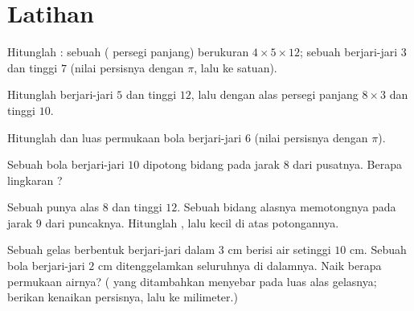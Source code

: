 \section{Latihan}

\begin{exercise}[$\star$]\label{exo:g9:solids:1}
Hitunglah : sebuah  ( persegi panjang) berukuran
$4 \times 5 \times 12$; sebuah  berjari-jari $3$ dan tinggi $7$
(nilai persisnya dengan $\pi$, lalu  ke satuan).
\end{exercise}

\begin{exercise}[$\star$]\label{exo:g9:solids:2}
Hitunglah   berjari-jari $5$ dan tinggi $12$, lalu 
 dengan alas persegi panjang $8 \times 3$ dan tinggi $10$.
\end{exercise}

\begin{exercise}[$\star$]\label{exo:g9:solids:3}
Hitunglah  dan luas permukaan bola berjari-jari $6$ (nilai
persisnya dengan $\pi$).
\end{exercise}

\begin{exercise}[$\star$]\label{exo:g9:solids:4}
Sebuah bola berjari-jari $10$ dipotong bidang pada jarak $8$ dari
pusatnya. Berapa  lingkaran ?
\end{exercise}

\begin{exercise}[$\star\star$]\label{exo:g9:solids:5}
Sebuah  punya  alas $8$ dan tinggi $12$. Sebuah bidang
 alasnya memotongnya pada jarak $9$ dari puncaknya. Hitunglah
 , lalu   kecil di atas potongannya.
\end{exercise}

\begin{exercise}[$\star\star$]\label{exo:g9:solids:6}
Sebuah gelas berbentuk  berjari-jari dalam $3$ cm berisi air
setinggi $10$ cm. Sebuah bola berjari-jari $2$ cm ditenggelamkan
seluruhnya di dalamnya. Naik berapa permukaan airnya? ( yang
ditambahkan menyebar pada luas alas gelasnya; berikan kenaikan
persisnya, lalu  ke milimeter.)
\end{exercise}

